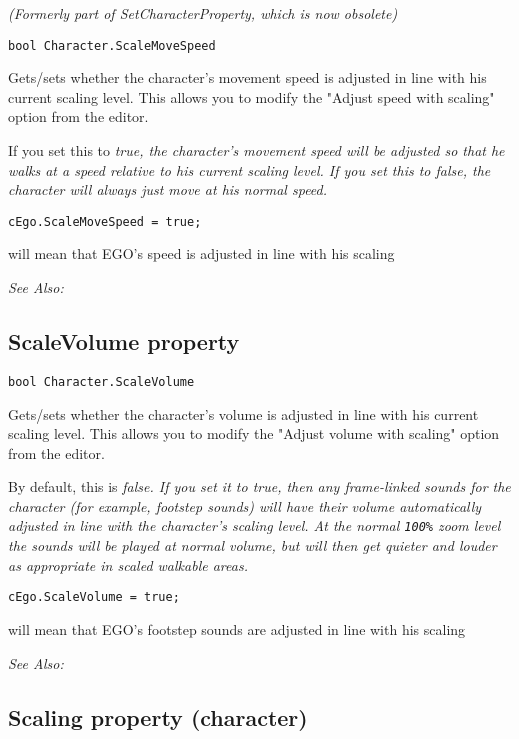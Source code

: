 \it{(Formerly part of SetCharacterProperty, which is now obsolete)}

\begin{verbatim}
bool Character.ScaleMoveSpeed
\end{verbatim}
Gets/sets whether the character's movement speed is adjusted in line with his
current scaling level. This allows you to modify the "Adjust speed with scaling" option
from the editor.

If you set this to \it{true}, the character's movement speed will be adjusted so that he walks
at a speed relative to his current scaling level. If you set this to \it{false}, the character
will always just move at his normal speed.

\begin{verbatim}
cEgo.ScaleMoveSpeed = true;
\end{verbatim}
will mean that EGO's speed is adjusted in line with his scaling

\it{See Also:} 


\subsection{ScaleVolume property}\label{Character.ScaleVolume}%

\begin{verbatim}
bool Character.ScaleVolume
\end{verbatim}
Gets/sets whether the character's volume is adjusted in line with his
current scaling level. This allows you to modify the "Adjust volume with scaling" option
from the editor.

By default, this is \it{false}. If you set it to \it{true}, then any frame-linked
sounds for the character (for example, footstep sounds) will have their volume
automatically adjusted in line with the character's scaling level. At the normal \verb$100%$
zoom level the sounds will be played at normal volume, but will then get quieter
and louder as appropriate in scaled walkable areas.

\begin{verbatim}
cEgo.ScaleVolume = true;
\end{verbatim}
will mean that EGO's footstep sounds are adjusted in line with his scaling

\it{See Also:} 


\subsection{Scaling property (character)}\label{Character.Scaling}%

